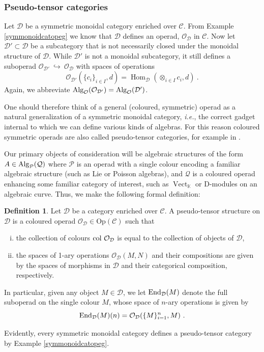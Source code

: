 \documentclass[11pt]{amsart}
\numberwithin{equation}{section}
\theoremstyle{definition}
\newtheorem{defn}[theo]{Definition}
\newcommand{\bb}{\mathbb}
\newcommand{\mc}{\mathcal}
\newcommand{\cEnd}{{\textup{End}}}
\newcommand{\D}{{\mathcal{D}}}
\DeclareMathOperator{\Hom}{Hom}
\DeclareMathOperator{\Vect}{Vect}
\newcommand{\ik}{{\bb K}}
\newcommand{\into}{{\ \hookrightarrow\ }}
\newcommand{\Alg}{{\textup{Alg}}}
\newcommand{\col}{{{\textup{col }}}}
\newcommand{\Op}{{\textup{Op}}}
\newcommand{\CC}{{\textup{CC}}}
\newcommand{\0}{{\textbf{0}}}
\def\CC{{\mc C}}
\def\OO{{\mc O}}
\def\PP{{\mc P}}
\def\QQ{{\mc Q}}
\def \Op{\mathrm{Op}}
\def \ie{{\it i.e.}}
\begin{document}
\subsubsection{Pseudo-tensor categories}

Let $\D$ be a symmetric monoidal category enriched over $\CC$. From Example \ref{symmonoidcatopeg} we know that $\D$ defines an operad, $\OO_\D$ in $\CC$. Now let $\D'\subset \D$ be a subcategory that is not necessarily closed under the monoidal structure of $\D$. While $\D'$ is not a monoidal subcategory, it still defines a suboperad $\OO_{\D'}\into \OO_\D$ with spaces of operations
\[
\mc O_{\D'}(\{c_i\}_{i\in I},d)=\Hom_{\D}(\otimes_{i\in I} c_i,d) \ .
\]
Again, we abbreviate $\Alg_{\mc O}(\mc O_{\D'})=\Alg_{\mc O}(\D')$.

One should therefore think of a general (coloured, symmetric) operad as a natural generalization of a symmetric monoidal category, \ie, the correct gadget internal to which we can define various kinds of algebras. For this reason coloured symmetric operads are also called pseudo-tensor categories, for example in \cite{BD1}.

Our primary objects of consideration will be algebraic structures of the form $A\in \Alg_{ \PP}(\QQ)$ where $\PP$ is an operad with a single colour encoding a familiar algebraic structure (such as Lie or Poisson algebras), and $\QQ$ is a coloured operad enhancing some familiar category of interest, such as $\Vect_\ik$ or D-modules on an algebraic curve. Thus, we make the following formal definition:

\begin{defn}\label{pseudotensordefn} Let $\D$ be a category enriched over $\CC$. A pseudo-tensor structure on $\D$ is a coloured operad $\mc O_\D\in \Op(\CC)$ such that
	\begin{enumerate}[(i)]
		\item the collection of colours $\col \mc O_{\mc D}$ is equal to the collection of objects of $\mc D$, 
		\item the spaces of 1-ary operations $\mc O_{\mc D}(M,N)$ and their compositions are given by the spaces of morphisms in $\D$ and their categorical composition, respectively.
	\end{enumerate}
	
In particular, given any object $M\in \mc D$, we let $\cEnd_{\mc D}(M)$ denote the full suboperad on the single colour $M$, whose space of $n$-ary operations is given by
\begin{equation}\label{pseudotensendopeqn}
	\cEnd_{\mc D}(M)(n) = \mc O_{\mc D}( \{ M\}_{i=1}^n, M) \ .  
\end{equation}
\end{defn}
Evidently, every symmetric monoidal category defines a pseudo-tensor category by Example \ref{symmonoidcatopeg}.
\end{document}
